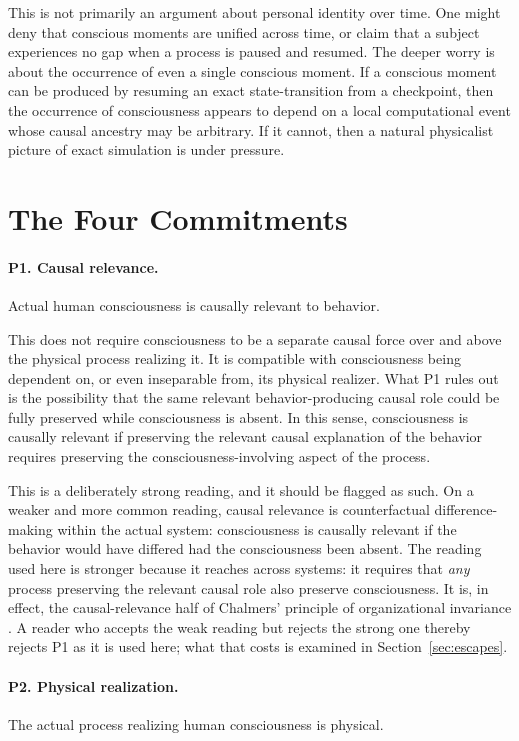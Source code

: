 \documentclass[11pt]{article}
\begin{document}
This is not primarily an argument about personal identity over time. One might
deny that conscious moments are unified across time, or claim that a subject
experiences no gap when a process is paused and resumed. The deeper worry is
about the occurrence of even a single conscious moment. If a conscious moment
can be produced by resuming an exact state-transition from a checkpoint, then
the occurrence of consciousness appears to depend on a local computational
event whose causal ancestry may be arbitrary. If it cannot, then a natural
physicalist picture of exact simulation is under pressure.

\section{The Four Commitments}
\label{sec:commitments}

\paragraph{P1. Causal relevance.}
Actual human consciousness is causally relevant to behavior.

This does not require consciousness to be a separate causal force over and
above the physical process realizing it. It is compatible with consciousness
being dependent on, or even inseparable from, its physical realizer. What P1
rules out is the possibility that the same relevant behavior-producing causal
role could be fully preserved while consciousness is absent. In this sense,
consciousness is causally relevant if preserving the relevant causal
explanation of the behavior requires preserving the consciousness-involving
aspect of the process.

This is a deliberately strong reading, and it should be flagged as such. On a
weaker and more common reading, causal relevance is counterfactual
difference-making within the actual system: consciousness is causally relevant
if the behavior would have differed had the consciousness been absent. The
reading used here is stronger because it reaches across systems: it requires
that \emph{any} process preserving the relevant causal role also preserve
consciousness. It is, in effect, the causal-relevance half of Chalmers'
principle of organizational invariance \cite{chalmers1996}. A reader who
accepts the weak reading but rejects the strong one thereby rejects P1 as it is
used here; what that costs is examined in Section~\ref{sec:escapes}.

\paragraph{P2. Physical realization.}
The actual process realizing human consciousness is physical.
\end{document}
